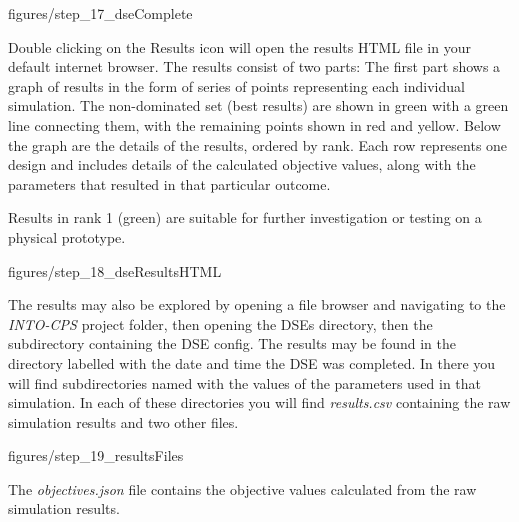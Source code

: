 \documentclass[11pt,a4paper]{../tutorial}
\begin{document}
{\begin{center}\begin{annotation}[width=0.7\linewidth,trim=0 0 0 0,clip]{figures/step_17_dseComplete}
    \end{annotation}\end{center}
\newpage
Double clicking on the Results icon will open the results HTML file in your default internet browser. The results consist of two parts:  The first part shows a graph of results in the form of series of points representing each individual simulation. The non-dominated set (best results) are shown in green with a green line connecting them, with the remaining points shown in red and yellow. Below the graph are the details of the results, ordered by rank.  Each row represents one design and includes details of the calculated objective values, along with the parameters that resulted in that particular outcome.

Results in rank 1 (green) are suitable for further investigation or testing on a physical prototype.

\begin{center}\begin{annotation}[width=0.7\linewidth,trim=0 0 0 0,clip]{figures/step_18_dseResultsHTML}
    \end{annotation}\end{center}

The results may also be explored by opening a file browser and navigating to the \emph{INTO-CPS} project folder, then opening the DSEs directory, then the subdirectory containing the DSE config. The results may be found in the directory labelled with the date and time the DSE was completed.  In there you will find subdirectories named with the values of the parameters used in that simulation.  In each of these directories you will find \emph{results.csv} containing the raw simulation results and two other files.

\begin{center}\begin{annotation}[width=0.7\linewidth,trim=0 0 0 0,clip]{figures/step_19_resultsFiles}
    \end{annotation}\end{center}
\newpage
The \emph{objectives.json} file contains the objective values calculated from the raw simulation results.

}
\end{document}
